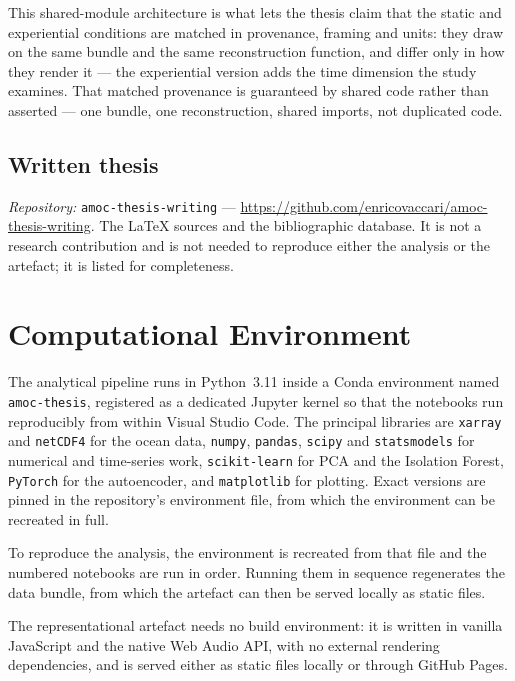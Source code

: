 \noindent This shared-module architecture is what lets the thesis claim that the static and
experiential conditions are matched in provenance, framing and units: they draw on the same bundle and the same
reconstruction function, and differ only in how they render it --- the experiential version adds the time dimension the study examines. That matched provenance is
guaranteed by shared code rather than asserted --- one bundle, one reconstruction, shared
imports, not duplicated code.

\subsection*{Written thesis}
\textit{Repository:} \texttt{amoc-thesis-writing} ---
\url{https://github.com/enricovaccari/amoc-thesis-writing}. The \LaTeX{} sources and the
bibliographic database. It is not a research contribution and is not needed to reproduce
either the analysis or the artefact; it is listed for completeness.

\section{Computational Environment}
\label{app:c-environment}

The analytical pipeline runs in Python~3.11 inside a Conda environment named
\texttt{amoc-thesis}, registered as a dedicated Jupyter kernel so that the notebooks run
reproducibly from within Visual Studio Code. The principal libraries are \texttt{xarray} and
\texttt{netCDF4} for the ocean data, \texttt{numpy}, \texttt{pandas}, \texttt{scipy} and
\texttt{statsmodels} for numerical and time-series work, \texttt{scikit-learn} for PCA and the
Isolation Forest, \texttt{PyTorch} for the autoencoder, and \texttt{matplotlib} for plotting.
Exact versions are pinned in the repository's environment file, from which the environment can
be recreated in full.

To reproduce the analysis, the environment is recreated from that file and the numbered
notebooks are run in order. Running them in sequence regenerates the data bundle, from which
the artefact can then be served locally as static files.

The representational artefact needs no build environment: it is written in vanilla JavaScript
and the native Web Audio API, with no external rendering dependencies, and is
served either as static files locally or through GitHub Pages.

